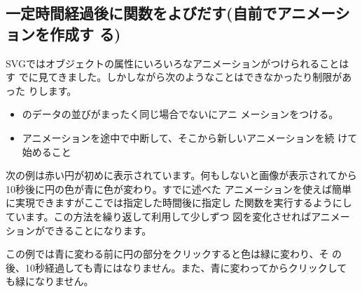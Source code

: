 \subsection{一定時間経過後に関数をよびだす(自前でアニメーションを作成す
る)}
SVGではオブジェクトの属性にいろいろなアニメーションがつけられることはす
でに見てきました。しかしながら次のようなことはできなかったり制限があった
りします。
\begin{itemize}
 \item {}のデータの並びがまったく同じ場合でないにアニ
       メーションをつける。
 \item アニメーションを途中で中断して、そこから新しいアニメーションを続
       けて始めること
\end{itemize}

次の例は赤い円が初めに表示されています。何もしないと画像が表示されてから
10秒後に円の色が青に色が変わり。すでに述べた
アニメーションを使えば簡単に実現できますがここでは指定した時間後に指定し
た関数を実行するようにしています。この方法を繰り返して利用して少しずつ
図を変化させればアニメーションができることになります。

この例では青に変わる前に円の部分をクリックすると色は緑に変わり、そ
の後、10秒経過しても青にはなりません。また、青に変わってからクリックして
も緑になりません。

